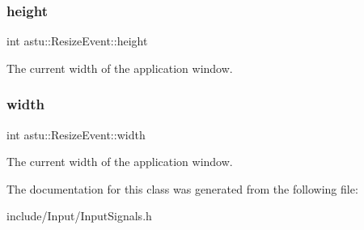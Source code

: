 \subsubsection{\texorpdfstring{height}{height}}
{\footnotesize\ttfamily int astu\+::\+Resize\+Event\+::height}

The current width of the application window. \mbox{\label{classastu_1_1ResizeEvent_a66a7c2ec2a1a3bc9ac7cdbe1caf64800}} 
\subsubsection{\texorpdfstring{width}{width}}
{\footnotesize\ttfamily int astu\+::\+Resize\+Event\+::width}

The current width of the application window. 

The documentation for this class was generated from the following file\+:\begin{DoxyCompactItemize}
\item 
include/\+Input/Input\+Signals.\+h\end{DoxyCompactItemize}
